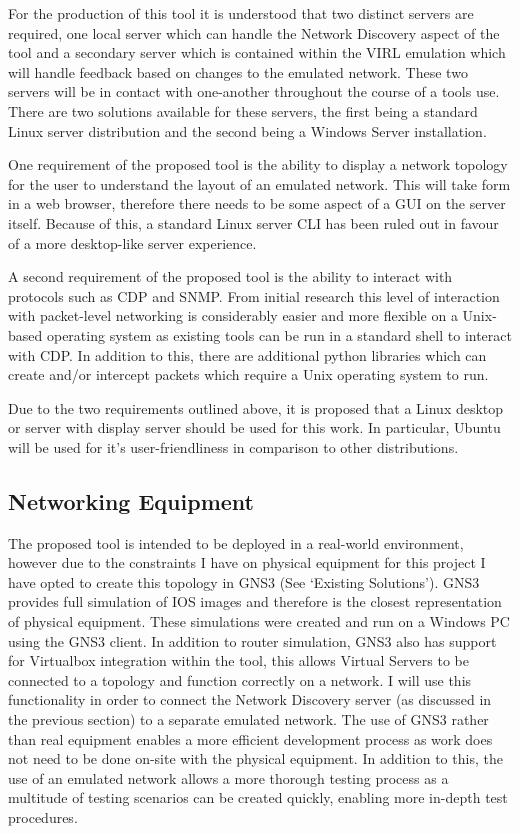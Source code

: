 \documentclass[11pt]{report}
\begin{document}
For the production of this tool it is understood that two distinct servers are required, one local server which can handle the Network Discovery aspect of the tool and a secondary server which is contained within the VIRL emulation which will handle feedback based on changes to the emulated network. These two servers will be in contact with one-another throughout the course of a tools use. There are two solutions available for these servers, the first being a standard Linux server distribution and the second being a Windows Server installation.

One requirement of the proposed tool is the ability to display a network topology for the user to understand the layout of an emulated network. This will take form in a web browser, therefore there needs to be some aspect of a GUI on the server itself. Because of this, a standard Linux server CLI has been ruled out in favour of a more desktop-like server experience.

A second requirement of the proposed tool is the ability to interact with protocols such as CDP and SNMP. From initial research this level of interaction with packet-level networking is considerably easier and more flexible on a Unix-based operating system as existing tools can be run in a standard shell to interact with CDP. In addition to this, there are additional python libraries which can create and/or intercept packets which require a Unix operating system to run.

Due to the two requirements outlined above, it is proposed that a Linux desktop or server with display server should be used for this work. In particular, Ubuntu will be used for it's user-friendliness in comparison to other distributions.

\subsection{Networking Equipment}

The proposed tool is intended to be deployed in a real-world environment, however due to the constraints I have on physical equipment for this project I have opted to create this topology in GNS3 (See ‘Existing Solutions’). GNS3 provides full simulation of IOS images and therefore is the closest representation of physical equipment. These simulations were created and run on a Windows PC using the GNS3 client. In addition to router simulation, GNS3 also has support for Virtualbox integration within the tool, this allows Virtual Servers to be connected to a topology and function correctly on a network. I will use this functionality in order to connect the Network Discovery server (as discussed in the previous section) to a separate emulated network. The use of GNS3 rather than real equipment enables a more efficient development process as work does not need to be done on-site with the physical equipment. In addition to this, the use of an emulated network allows a more thorough testing process as a multitude of testing scenarios can be created quickly, enabling more in-depth test procedures.
\end{document}
